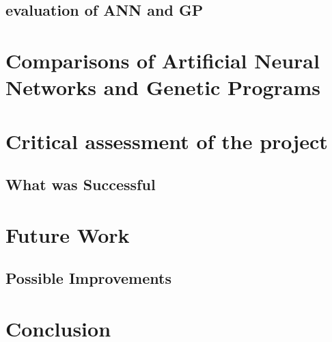 \documentclass[11pt]{article}
\begin{document}



\subsection{evaluation of ANN and GP }
 

\newpage
\section{Comparisons of Artificial Neural Networks and Genetic Programs}
\newpage
\section{Critical assessment of the project }
\subsection{What was Successful}

\newpage
\section{Future Work}
\subsection{Possible Improvements}

\newpage
\section{Conclusion}
\end{document}
